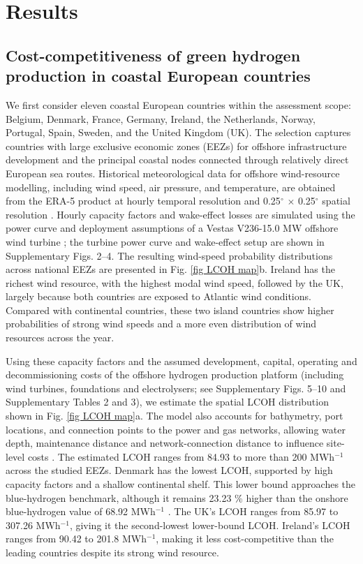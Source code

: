 \documentclass[pdflatex,sn-mathphys,Numbered]{sn-jnl}%
\begin{document}
\section{Results}

\subsection{Cost-competitiveness of green hydrogen production in coastal European countries}

We first consider eleven coastal European countries within the assessment scope: Belgium, Denmark, France, Germany, Ireland, the Netherlands, Norway, Portugal, Spain, Sweden, and the United Kingdom (UK). The selection captures countries with large exclusive economic zones (EEZs) for offshore infrastructure development and the principal coastal nodes connected through relatively direct European sea routes. Historical meteorological data for offshore wind-resource modelling, including wind speed, air pressure, and temperature, are obtained from the ERA-5 product at hourly temporal resolution and 0.25$^\circ$ $\times$ 0.25$^\circ$ spatial resolution \cite{ERA5}. Hourly capacity factors and wake-effect losses are simulated using the power curve and deployment assumptions of a Vestas V236-15.0 MW offshore wind turbine \cite{V23615}; the turbine power curve and wake-effect setup are shown in Supplementary Figs. 2--4. The resulting wind-speed probability distributions across national EEZs are presented in Fig. \ref{fig LCOH map}b. Ireland has the richest wind resource, with the highest modal wind speed, followed by the UK, largely because both countries are exposed to Atlantic wind conditions. Compared with continental countries, these two island countries show higher probabilities of strong wind speeds and a more even distribution of wind resources across the year.

Using these capacity factors and the assumed development, capital, operating and decommissioning costs of the offshore hydrogen production platform (including wind turbines, foundations and electrolysers; see Supplementary Figs. 5--10 and Supplementary Tables 2 and 3), we estimate the spatial LCOH distribution shown in Fig. \ref{fig LCOH map}a. The model also accounts for bathymetry, port locations, and connection points to the power and gas networks, allowing water depth, maintenance distance and network-connection distance to influence site-level costs \cite{bathymetry_2022, EMODnet}. The estimated LCOH ranges from 84.93 to more than 200 \texteuro{} MWh$^{-1}$ across the studied EEZs. Denmark has the lowest LCOH, supported by high capacity factors and a shallow continental shelf. This lower bound approaches the blue-hydrogen benchmark, although it remains 23.23 \% higher than the onshore blue-hydrogen value of 68.92 \texteuro{} MWh$^{-1}$ \cite{Globalaveragelevelised}. The UK's LCOH ranges from 85.97 to 307.26 \texteuro{} MWh$^{-1}$, giving it the second-lowest lower-bound LCOH. Ireland's LCOH ranges from 90.42 to 201.8 \texteuro{} MWh$^{-1}$, making it less cost-competitive than the leading countries despite its strong wind resource.
\end{document}

